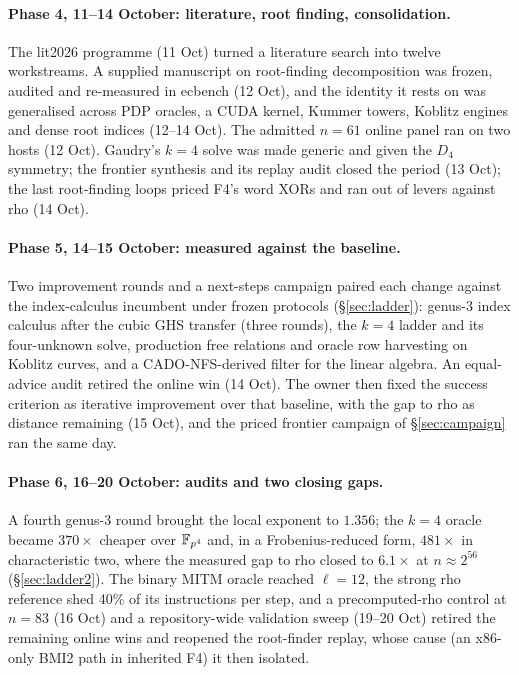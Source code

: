 \paragraph{Phase 4, 11--14 October: literature, root finding,
consolidation.} The lit2026 programme (11 Oct) turned a literature search
into twelve workstreams. A supplied manuscript on root-finding
decomposition was frozen, audited and re-measured in ecbench (12 Oct), and
the identity it rests on was generalised across PDP oracles, a CUDA
kernel, Kummer towers, Koblitz engines and dense root indices (12--14
Oct). The admitted $n=61$ online panel ran on two hosts (12 Oct). Gaudry's
$k=4$ solve was made generic and given the $D_4$ symmetry; the frontier
synthesis and its replay audit closed the period (13 Oct); the last
root-finding loops priced F4's word XORs and ran out of levers against rho
(14 Oct).

\paragraph{Phase 5, 14--15 October: measured against the baseline.} Two
improvement rounds and a next-steps campaign paired each change against
the index-calculus incumbent under frozen protocols
(\S\ref{sec:ladder}): genus-3 index calculus after the cubic GHS transfer (three rounds),
the $k=4$ ladder and its four-unknown solve, production free relations and
oracle row harvesting on Koblitz curves, and a CADO-NFS-derived filter for
the linear algebra. An equal-advice audit retired the online win (14 Oct).
The owner then fixed the success criterion as iterative improvement over
that baseline, with the gap to rho as distance remaining (15 Oct), and the
priced frontier campaign of \S\ref{sec:campaign} ran the same day.

\paragraph{Phase 6, 16--20 October: audits and two closing gaps.} A fourth
genus-3 round brought the local exponent to $1.356$; the $k=4$ oracle became
$370\times$ cheaper over $\mathbb{F}_{p^4}$ and, in a Frobenius-reduced form,
$481\times$ in characteristic two, where the measured gap to rho closed to
$6.1\times$ at $n\approx2^{56}$ (\S\ref{sec:ladder2}). The binary MITM oracle
reached $\ell=12$, the strong rho reference shed 40\% of its instructions
per step, and a precomputed-rho control at $n=83$ (16 Oct) and a
repository-wide validation sweep (19--20 Oct) retired the remaining online
wins and reopened the root-finder replay, whose cause (an x86-only BMI2 path
in inherited F4) it then isolated.

